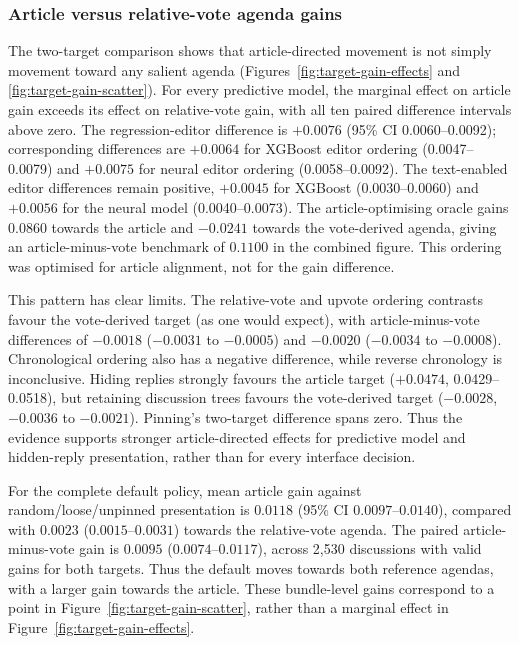 \subsubsection{Article versus relative-vote agenda gains}
The two-target comparison shows that article-directed movement is not simply movement toward any salient agenda (Figures~\ref{fig:target-gain-effects} and \ref{fig:target-gain-scatter}). For every predictive model, the marginal effect on article gain exceeds its effect on relative-vote gain, with all ten paired difference intervals above zero. The regression-editor difference is $+0.0076$ (95\% CI 0.0060--0.0092); corresponding differences are $+0.0064$ for XGBoost editor ordering (0.0047--0.0079) and $+0.0075$ for neural editor ordering (0.0058--0.0092). The text-enabled editor differences remain positive, $+0.0045$ for XGBoost (0.0030--0.0060) and $+0.0056$ for the neural model (0.0040--0.0073). The article-optimising oracle gains $0.0860$ towards the article and $-0.0241$ towards the vote-derived agenda, giving an article-minus-vote benchmark of $0.1100$ in the combined figure. This ordering was optimised for article alignment, not for the gain difference.

This pattern has clear limits. The relative-vote and upvote ordering contrasts favour the vote-derived target (as one would expect), with article-minus-vote differences of $-0.0018$ ($-0.0031$ to $-0.0005$) and $-0.0020$ ($-0.0034$ to $-0.0008$). Chronological ordering also has a negative difference, while reverse chronology is inconclusive. Hiding replies strongly favours the article target ($+0.0474$, 0.0429--0.0518), but retaining discussion trees favours the vote-derived target ($-0.0028$, $-0.0036$ to $-0.0021$). Pinning's two-target difference spans zero. Thus the evidence supports stronger article-directed effects for predictive model and hidden-reply presentation, rather than for every interface decision.

For the complete default policy, mean article gain against random/loose/unpinned presentation is $0.0118$ (95\% CI $0.0097$--$0.0140$), compared with $0.0023$ ($0.0015$--$0.0031$) towards the relative-vote agenda. The paired article-minus-vote gain is $0.0095$ ($0.0074$--$0.0117$), across 2,530 discussions with valid gains for both targets. Thus the default moves towards both reference agendas, with a larger gain towards the article. These bundle-level gains correspond to a point in Figure~\ref{fig:target-gain-scatter}, rather than a marginal effect in Figure~\ref{fig:target-gain-effects}.

